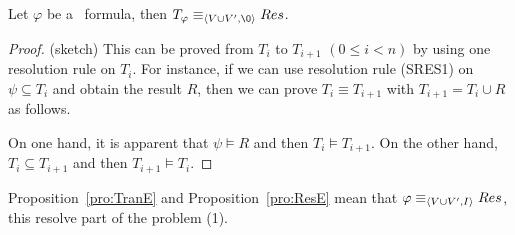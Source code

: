 \documentclass{article}
\begin{document}
\begin{proposition}\label{pro:ResE}
 Let $\varphi$ be a \CTL\ formula,
 then $T_{\varphi} \equiv_{\tuple{V \cup V', {\O}}} Res$.
\end{proposition}
\begin{proof}(sketch)
This can be proved from $T_i$ to $T_{i+1}$ $(0\leq i < n)$ by using one resolution rule on $T_i$.
For instance, if we can use resolution rule (SRES1) on $\psi\subseteq T_i$ and obtain the result $R$, then we can prove $T_i \equiv T_{i+1}$ with $T_{i+1} = T_i \cup R$ as follows.

On one hand, it is apparent that $\psi \models R$ and then $T_i \models T_{i+1}$. On the other hand, $T_i\subseteq T_{i+1}$ and then $T_{i+1} \models T_i$.




%

%

\end{proof}
Proposition~\ref{pro:TranE} and Proposition~\ref{pro:ResE} mean that $\varphi \equiv_{{\langle{V \cup V', I}\rangle}} Res$, this resolve part of the problem (1).
\end{document}
